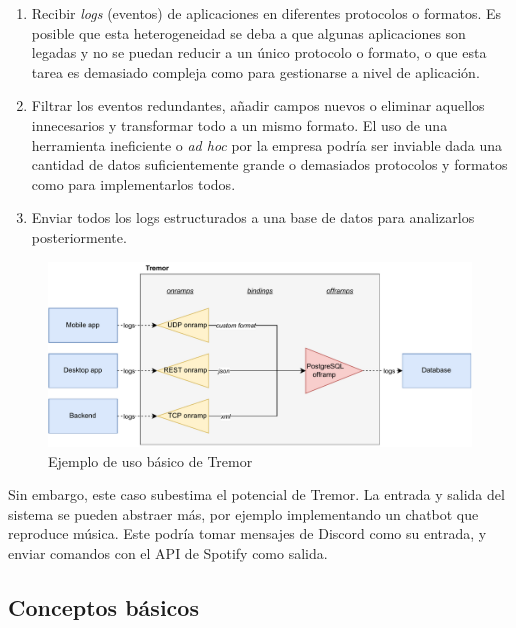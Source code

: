 \begin{enumerate}
    \item Recibir \emph{logs} (eventos) de aplicaciones en diferentes protocolos
        o formatos. Es posible que esta heterogeneidad se deba a que algunas
        aplicaciones son legadas y no se puedan reducir a un único protocolo o
        formato, o que esta tarea es demasiado compleja como para gestionarse a
        nivel de aplicación.

    \item Filtrar los eventos redundantes, añadir campos nuevos o eliminar
        aquellos innecesarios y transformar todo a un mismo formato. El uso de
        una herramienta ineficiente o \emph{ad hoc} por la empresa podría ser
        inviable dada una cantidad de datos suficientemente grande o demasiados
        protocolos y formatos como para implementarlos todos.

    \item Enviar todos los logs estructurados a una base de datos para
        analizarlos posteriormente.

\end{enumerate}

\begin{figure}
    \centering
    \includegraphics[width=\textwidth]{./Imagenes/example.pdf}
    \caption{Ejemplo de uso básico de Tremor}%
    \label{fig:tremor_example}
\end{figure}

Sin embargo, este caso subestima el potencial de Tremor. La entrada y salida del
sistema se pueden abstraer más, por ejemplo implementando un chatbot que
reproduce música. Este podría tomar mensajes de Discord como su entrada, y
enviar comandos con el API de Spotify como salida.

\subsection{Conceptos básicos}

